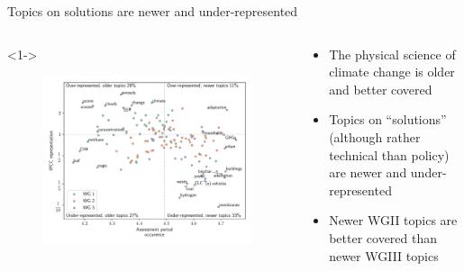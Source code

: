 \documentclass[9pt, aspectratio=169]{beamer}
\begin{document}
\begin{frame}{Topics on solutions are newer and under-represented}

\vspace{-0.5cm}

\begin{columns}
	
	\begin{column}{0.618\linewidth}<1->
		\begin{figure}[h!]
			\begin{center}
				\includegraphics[width=\linewidth]{../plots_pub/rep_time_lp.pdf}
			\end{center}
		\end{figure}
		
	\end{column}
	\begin{column}{0.382\linewidth}
		\begin{itemize}
			\item<1-> The physical science of climate change is older and better covered
			\item<2-> Topics on ``solutions'' (although rather technical than policy) are newer and under-represented
			\item<3-> Newer WGII topics are better covered than newer WGIII topics
			
			
		\end{itemize}
	\end{column}
\end{columns}
\end{frame}
\end{document}
